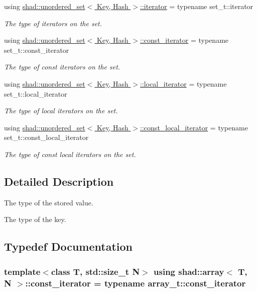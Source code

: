 \begin{DoxyCompactItemize}
using \hyperlink{group__Types_gadbad50ac069a38bd820c0a9f532f903e}{shad\-::unordered\-\_\-set$<$ Key, Hash $>$\-::iterator} = typename set\-\_\-t\-::iterator
\begin{DoxyCompactList}\small\item\em The type of iterators on the set. \end{DoxyCompactList}\item 
using \hyperlink{group__Types_ga074f67d0516c3a68d8c79976aef62fb1}{shad\-::unordered\-\_\-set$<$ Key, Hash $>$\-::const\-\_\-iterator} = typename set\-\_\-t\-::const\-\_\-iterator
\begin{DoxyCompactList}\small\item\em The type of const iterators on the set. \end{DoxyCompactList}\item 
using \hyperlink{group__Types_gae1ee2e5ce1b39afa3cb1ce248747324d}{shad\-::unordered\-\_\-set$<$ Key, Hash $>$\-::local\-\_\-iterator} = typename set\-\_\-t\-::local\-\_\-iterator
\begin{DoxyCompactList}\small\item\em The type of local iterators on the set. \end{DoxyCompactList}\item 
using \hyperlink{group__Types_gac14878d16fabddc52f8dd35465f3155e}{shad\-::unordered\-\_\-set$<$ Key, Hash $>$\-::const\-\_\-local\-\_\-iterator} = typename set\-\_\-t\-::const\-\_\-local\-\_\-iterator
\begin{DoxyCompactList}\small\item\em The type of const local iterators on the set. \end{DoxyCompactList}\end{DoxyCompactItemize}


\subsection{Detailed Description}
The type of the stored value.

The type of the key. 

\subsection{Typedef Documentation}
\hypertarget{group__Types_ga2c50f8cbc96829f139f8138f1bac40bf}{
\subsubsection[{const\-\_\-iterator}]{\setlength{\rightskip}{0pt plus 5cm}template$<$class T, std\-::size\-\_\-t N$>$ using {\bf shad\-::array}$<$ T, N $>$\-::const\-\_\-iterator =  typename array\-\_\-t\-::const\-\_\-iterator}}\label{group__Types_ga2c50f8cbc96829f139f8138f1bac40bf}


